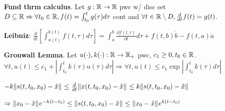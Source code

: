 \begin{Theorem}
\textbf{Fund thrm calculus}. Let $g:\mathbb R\to\mathbb R$ pwc w/ disc set $D\subseteq\mathbb R\Rightarrow\forall t_0\in\mathbb R,f(t)=\int_{t_0}^t g(\tau)d\tau$ cont and $\forall t\in\mathbb R\setminus D,\frac{d}{dt}f(t)=g(t)$.
\end{Theorem}
\begin{Theorem}
\textbf{Leibniz}:
$
\frac{d}{dt}\left[\int_{a(t)}^{b(t)}f(t,\tau)d\tau\right]=
\int_{a}^{b}\frac{\partial f(t,\tau)}{\partial t}d\tau+f(t,b)\dot b-
f(t,a)\dot a
$
\end{Theorem}
\begin{Theorem}
\textbf{Gronwall Lemma}. Let $u(\cdot),k(\cdot):\mathbb R\to\mathbb R_+$ pwc, $c_1\ge 0,t_0\in\mathbb R$. $\forall t,u(t)\le c_1+\left| \int_{t_0}^{t}k(\tau)u(\tau)d\tau \right|\Rightarrow \forall t, u(t)\le c_1\exp\left| \int_{t_0}^t k(\tau)d\tau \right|$

\begin{Example}
$-k\|s(t,t_0,x_0)-\hat x\|_{}\le \frac{d}{dt}\|x(t,t_0,x_0)-\hat x\|_{}\le k\|s(t,t_0,x_0)-\hat x\|_{}$

$\Rightarrow \|x_0-\hat x\|_{}e^{-k(t-t_0)}\le \|s(t,t_0,x_0)-\hat x\|_{}\le \|x_0-\hat x\|_{} e^{k(t-t_0)}$
\end{Example}
\end{Theorem}
